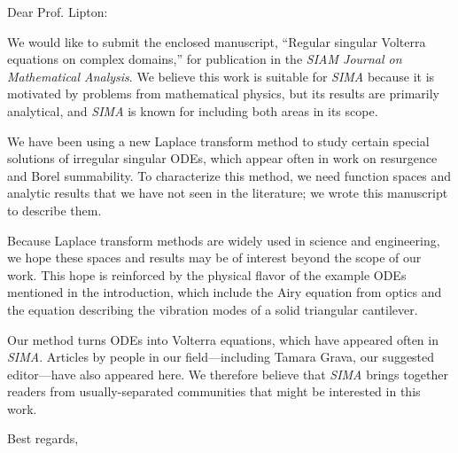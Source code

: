 \documentclass{letter}
\date{Octobter 31, 2023}
\begin{document}
\begin{letter}{}
\opening{Dear Prof. Lipton:}

We would like to submit the enclosed manuscript, ``Regular singular Volterra equations on complex domains,'' for publication in the \textit{SIAM Journal on Mathematical Analysis}. We believe this work is suitable for \textit{SIMA} because it is motivated by problems from mathematical physics, but its results are primarily analytical, and \textit{SIMA} is known for including both areas in its scope.

We have been using a new Laplace transform method to study certain special solutions of irregular singular ODEs, which appear often in work on resurgence and Borel summability. To characterize this method, we need function spaces and analytic results that we have not seen in the literature; we wrote this manuscript to describe them.

Because Laplace transform methods are widely used in science and engineering, we hope these spaces and results may be of interest beyond the scope of our work. This hope is reinforced by the physical flavor of the example ODEs mentioned in the introduction, which include the Airy equation from optics and the equation describing
the vibration modes of a solid triangular cantilever.

Our method turns ODEs into Volterra equations, which have appeared often in \textit{SIMA}. Articles by people in our field---including Tamara Grava, our suggested editor---have also appeared here. We therefore believe that \textit{SIMA} brings together readers from usually-separated communities that might be interested in this work.
\closing{Best regards,}
\end{letter}
\end{document}
